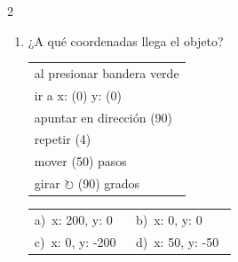 \documentclass[11pt,a4paper]{article}
\begin{document}
\begin{multicols}{2}
\begin{enumerate}[label=\textbf{\arabic*.},leftmargin=*,itemsep=10pt,topsep=0pt]
\item \begin{minipage}[t]{\linewidth}
¿A qué coordenadas llega el objeto?
\par\vspace{3pt}\hspace*{1em}\begin{tabular}{@{}l@{}}\ttfamily\small al presionar bandera verde \\
\ttfamily\small ir a x: (0) y: (0) \\
\ttfamily\small apuntar en dirección (90) \\
\ttfamily\small repetir (4) \\
\ttfamily\small \hspace*{1.5em}mover (50) pasos \\
\ttfamily\small \hspace*{1.5em}girar $\circlearrowright$ (90) grados
\end{tabular}\par

\vspace{4pt}
\begin{tabular}{@{}p{0.47\linewidth}p{0.47\linewidth}@{}}
a)~x: 200, y: 0 & b)~x: 0, y: 0 \\
c)~x: 0, y: -200 & d)~x: 50, y: -50 \\
\end{tabular}
\end{minipage}

\end{enumerate}
\end{multicols}
\end{document}

